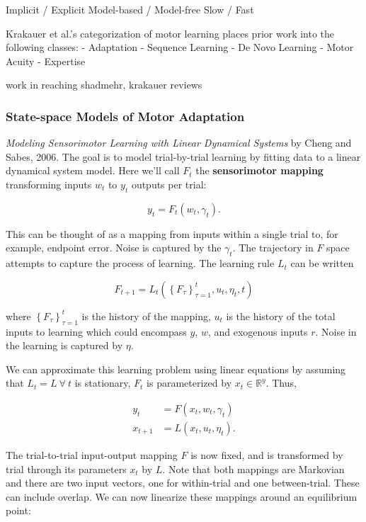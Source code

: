 Implicit / Explicit Model-based / Model-free Slow / Fast

Krakauer et al.'s categorization of motor learning places prior work
into the following classes: - Adaptation - Sequence Learning - De Novo
Learning - Motor Acuity - Expertise

work in reaching shadmehr, krakauer reviews

\subsubsection{State-space Models of Motor
Adaptation}\label{state-space-models-of-motor-adaptation}

\emph{Modeling Sensorimotor Learning with Linear Dynamical Systems} by
Cheng and Sabes, 2006. The goal is to model trial-by-trial learning by
fitting data to a linear dynamical system model. Here we'll call \(F_t\)
the \textbf{sensorimotor mapping} transforming inputs \(w_t\) to \(y_t\)
outputs per trial:

\[
y_t = F_t(w_t, \gamma_t).
\]

This can be thought of as a mapping from inputs within a single trial
to, for example, endpoint error. Noise is captured by the \(\gamma_t\).
The trajectory in \(F\) space attempts to capture the process of
learning. The learning rule \(L_t\) can be written

\[F_{t+1} = L_t\left(\left\{F_\tau\right\}_{\tau=1}^{t}, u_t, \eta_t, t\right)\]

where \(\left\{F_\tau\right\}_{\tau=1}^{t}\) is the history of the
mapping, \(u_t\) is the history of the total inputs to learning which
could encompass \(y\), \(w\), and exogenous inputs \(r\). Noise in the
learning is captured by \(\eta\).

We can approximate this learning problem using linear equations by
assuming that \(L_t=L \ \forall \ t\) is stationary, \(F_t\) is
parameterized by \(x_t\in\mathbb{R}^y\). Thus,

\[
\begin{aligned}
y_t &= F(x_t, w_t, \gamma_t) \\
x_{t+1} &= L(x_t, u_t, \eta_t).
\end{aligned}
\]

The trial-to-trial input-output mapping \(F\) is now fixed, and is
transformed by trial through its parameters \(x_t\) by \(L\). Note that
both mappings are Markovian and there are two input vectors, one for
within-trial and one between-trial. These can include overlap. We can
now linearize these mappings around an equilibrium point:

